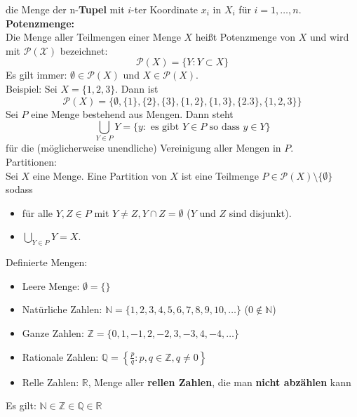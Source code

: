 \documentclass[12pt]{article}
\begin{document}
die Menge der n-\textbf{Tupel} mit $i$-ter Koordinate $x_i$ in $X_i$ für $i = 1,\dots,n$. \\
\newline
\textbf{Potenzmenge:} \\
Die Menge aller Teilmengen einer Menge $X$ heißt Potenzmenge von $X$ und wird mit $\mathcal{P(X)}$ bezeichnet:
\[\mathcal{P}(X) = \{Y: Y \subset X\}\]
Es gilt immer: $\emptyset \in \mathcal{P}(X)$ und $X \in \mathcal{P}(X)$.\\
Beispiel: Sei $X = \{1, 2, 3\}$. Dann ist \[\mathcal{P}(X) = \{\emptyset, \{1\}, \{2\}, \{3\}, \{1, 2\}, \{1, 3\}, \{2. 3\}, \{1, 2, 3\}\}\]
Sei $P$ eine Menge bestehend aus Mengen. Dann steht
\[\bigcup_{Y \in P} Y = \{y: \text{ es gibt } Y \in P \text{ so dass } y \in Y\}\]
für die (möglicherweise unendliche) Vereinigung aller Mengen in $P$. \\
\newline
Partitionen: \\
Sei $X$ eine Menge. Eine Partition von $X$ ist eine Teilmenge $P \in \mathcal{P}(X) \setminus \{\emptyset\}$ sodass
\begin{itemize}
    \item für alle $Y,Z \in P$ mit $Y \neq Z, Y \cap Z = \emptyset$ ($Y$ und $Z$ sind disjunkt).
    \item $\bigcup_{Y \in P} Y = X$. 
\end{itemize}
Definierte Mengen:
\begin{itemize}
    \item Leere Menge: $\emptyset = \{\}$
    \item Natürliche Zahlen: $\mathbb{N} = \{1, 2, 3, 4, 5, 6, 7, 8, 9, 10, \dots\}$ ($0 \notin \mathbb{N}$)
    \item Ganze Zahlen: $\mathbb{Z} = \{0, 1, -1, 2, -2, 3, -3, 4, -4, \dots\}$
    \item Rationale Zahlen: $\mathbb{Q} = \left\{\frac{p}{q} : p,q \in \mathbb{Z}, q \neq 0\right\}$
    \item Relle Zahlen: $\mathbb{R}$, Menge aller \textbf{rellen Zahlen}, die man \textbf{nicht abzählen} kann
\end{itemize}
Es gilt: $\mathbb{N} \in \mathbb{Z} \in \mathbb{Q} \in \mathbb{R}$
\end{document}

